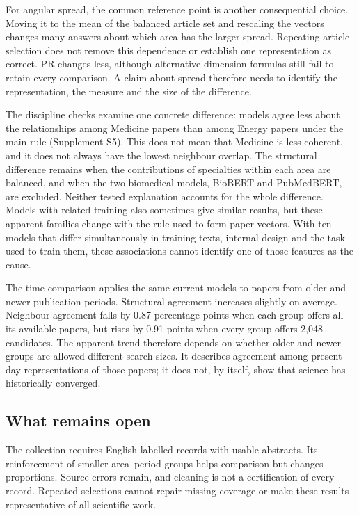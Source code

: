 \documentclass[12pt]{article}
\begin{document}
For angular spread, the common reference point is another consequential choice. Moving it to the mean of the balanced article set and rescaling the vectors changes many answers about which area has the larger spread. Repeating article selection does not remove this dependence or establish one representation as correct. PR changes less, although alternative dimension formulas still fail to retain every comparison. A claim about spread therefore needs to identify the representation, the measure and the size of the difference.

The discipline checks examine one concrete difference: models agree less about the relationships among Medicine papers than among Energy papers under the main rule (Supplement S5). This does not mean that Medicine is less coherent, and it does not always have the lowest neighbour overlap. The structural difference remains when the contributions of specialties within each area are balanced, and when the two biomedical models, BioBERT and PubMedBERT, are excluded. Neither tested explanation accounts for the whole difference. Models with related training also sometimes give similar results, but these apparent families change with the rule used to form paper vectors. With ten models that differ simultaneously in training texts, internal design and the task used to train them, these associations cannot identify one of those features as the cause.

The time comparison applies the same current models to papers from older and newer publication periods. Structural agreement increases slightly on average. Neighbour agreement falls by 0.87 percentage points when each group offers all its available papers, but rises by 0.91 points when every group offers 2,048 candidates. The apparent trend therefore depends on whether older and newer groups are allowed different search sizes. It describes agreement among present-day representations of those papers; it does not, by itself, show that science has historically converged.

\subsection{What remains open}
The collection requires English-labelled records with usable abstracts. Its reinforcement of smaller area--period groups helps comparison but changes proportions. Source errors remain, and cleaning is not a certification of every record. Repeated selections cannot repair missing coverage or make these results representative of all scientific work.
\end{document}
